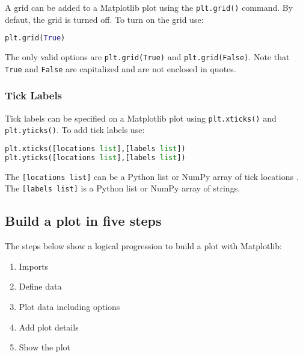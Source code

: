 \documentclass{book}
\providecommand{\tightlist}{%
      \setlength{\itemsep}{0pt}\setlength{\parskip}{0pt}}
\newcommand{\passthrough}[1]{#1}
\begin{document}
A grid can be added to a Matplotlib plot using the
\passthrough{\lstinline!plt.grid()!} command. By defaut, the grid is
turned off. To turn on the grid use:

\begin{lstlisting}[language=Python]
plt.grid(True)
\end{lstlisting}

The only valid options are \passthrough{\lstinline!plt.grid(True)!} and
\passthrough{\lstinline!plt.grid(False)!}. Note that
\passthrough{\lstinline!True!} and \passthrough{\lstinline!False!} are
capitalized and are not enclosed in quotes.
    




    
        \hypertarget{tick-labels}{%
\subsubsection{Tick Labels}\label{tick-labels}}

Tick labels can be specified on a Matplotlib plot using
\passthrough{\lstinline!plt.xticks()!} and
\passthrough{\lstinline!plt.yticks()!}. To add tick labels use:

\begin{lstlisting}[language=Python]
plt.xticks([locations list],[labels list])
plt.yticks([locations list],[labels list])
\end{lstlisting}

The \passthrough{\lstinline![locations list]!} can be a Python list or
NumPy array of tick locations . The
\passthrough{\lstinline![labels list]!} is a Python list or NumPy array
of strings.
    




    
        \hypertarget{build-a-plot-in-five-steps}{%
\subsection{Build a plot in five
steps}\label{build-a-plot-in-five-steps}}
    




    
        The steps below show a logical progression to build a plot with
Matplotlib:

\begin{enumerate}
\def\labelenumi{\arabic{enumi}.}
\tightlist
\item
  Imports
\item
  Define data
\item
  Plot data including options
\item
  Add plot details
\item
  Show the plot
\end{enumerate}
\end{document}
